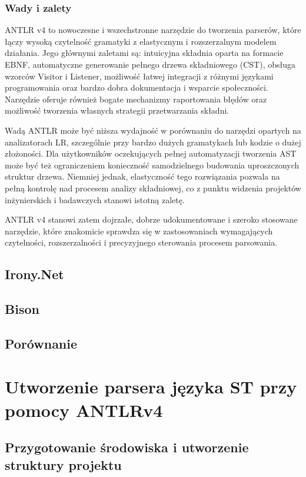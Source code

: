 \documentclass[12pt,twoside]{article}
\begin{document}
\subsubsection{Wady i zalety}
ANTLR v4 to nowoczesne i wszechstronne narzędzie do tworzenia parserów, które łączy wysoką czytelność gramatyki z elastycznym i rozszerzalnym modelem działania. Jego głównymi zaletami są: intuicyjna składnia oparta na formacie EBNF, automatyczne generowanie pełnego drzewa składniowego (CST), obsługa wzorców Visitor i Listener, możliwość łatwej integracji z różnymi językami programowania oraz bardzo dobra dokumentacja i wsparcie społeczności. Narzędzie oferuje również bogate mechanizmy raportowania błędów oraz możliwość tworzenia własnych strategii przetwarzania składni.

Wadą ANTLR może być niższa wydajność w porównaniu do narzędzi opartych na analizatorach LR, szczególnie przy bardzo dużych gramatykach lub kodzie o dużej złożoności. Dla użytkowników oczekujących pełnej automatyzacji tworzenia AST może być też ograniczeniem konieczność samodzielnego budowania uproszczonych struktur drzewa. Niemniej jednak, elastyczność tego rozwiązania pozwala na pełną kontrolę nad procesem analizy składniowej, co z punktu widzenia projektów inżynierskich i badawczych stanowi istotną zaletę.

ANTLR v4 stanowi zatem dojrzałe, dobrze udokumentowane i szeroko stosowane narzędzie, które znakomicie sprawdza się w zastosowaniach wymagających czytelności, rozszerzalności i precyzyjnego sterowania procesem parsowania.

\subsection{Irony.Net}
\subsection{Bison}
\subsection{Porównanie}
\clearpage
\section{Utworzenie parsera języka ST przy pomocy ANTLRv4}
\subsection{Przygotowanie środowiska i utworzenie struktury projektu}
\end{document}
